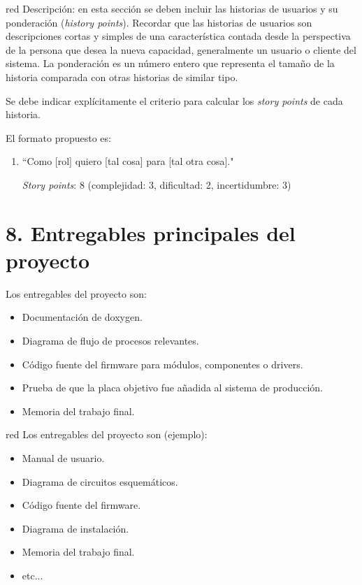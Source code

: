 \documentclass[
11pt, %
]{charter}
\begin{document}
\begin{consigna}{red}
Descripción: en esta sección se deben incluir las historias de usuarios y su ponderación (\textit{history points}). Recordar que las historias de usuarios son descripciones cortas y simples de una característica contada desde la perspectiva de la persona que desea la nueva capacidad, generalmente un usuario o cliente del sistema. La ponderación es un número entero que representa el tamaño de la historia comparada con otras historias de similar tipo.

Se debe indicar explícitamente el criterio para calcular los \textit{story points} de cada historia.

El formato propuesto es: 
\begin{enumerate}
\item ``Como [rol] quiero [tal cosa] para [tal otra cosa]."

\textit{Story points}: 8 (complejidad: 3, dificultad: 2, incertidumbre: 3)
\end{enumerate}
\end{consigna}

\section{8. Entregables principales del proyecto}
\label{sec:entregables}

Los entregables del proyecto son:

\begin{itemize}
	\item Documentación de doxygen.
	\item Diagrama de flujo de procesos relevantes.
	\item Código fuente del firmware para módulos, componentes o drivers.
	\item Prueba de que la placa objetivo fue añadida al sistema de producción.
	\item Memoria del trabajo final.
\end{itemize}

\begin{consigna}{red}
Los entregables del proyecto son (ejemplo):

\begin{itemize}
	\item Manual de usuario.
	\item Diagrama de circuitos esquemáticos.
	\item Código fuente del firmware.
	\item Diagrama de instalación.
	\item Memoria del trabajo final.
	\item etc...
\end{itemize}
\end{consigna}
\end{document}
